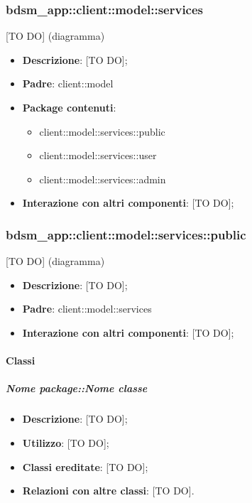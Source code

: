	\subsubsection{bdsm\_app::client::model::services} %
	\label{ssub:bdsm_app_client_model_services}
	[TO DO] (diagramma) \newline \newline

	\begin{itemize}
		\item \textbf{Descrizione}: [TO DO];
		\item \textbf{Padre}: client::model
		\item \textbf{Package contenuti}:
			\begin{itemize}
				\item client::model::services::public
				\item client::model::services::user
				\item client::model::services::admin
			\end{itemize}
		\item \textbf{Interazione con altri componenti}: [TO DO];
	\end{itemize}

	\subsubsection{bdsm\_app::client::model::services::public} %
	\label{ssub:bdsm_app_client_model_services_public}
	[TO DO] (diagramma) \newline \newline

	\begin{itemize}
		\item \textbf{Descrizione}: [TO DO];
		\item \textbf{Padre}: client::model::services
		\item \textbf{Interazione con altri componenti}: [TO DO];
	\end{itemize}

		\paragraph{Classi} %
			\subparagraph{Nome package::Nome classe} %
			\label{subp:subparagraph_name}
				\begin{itemize}
					\item \textbf{Descrizione}: [TO DO];
					\item \textbf{Utilizzo}: [TO DO];
					\item \textbf{Classi ereditate}: [TO DO];
					\item \textbf{Relazioni con altre classi}: [TO DO].
				\end{itemize}	

